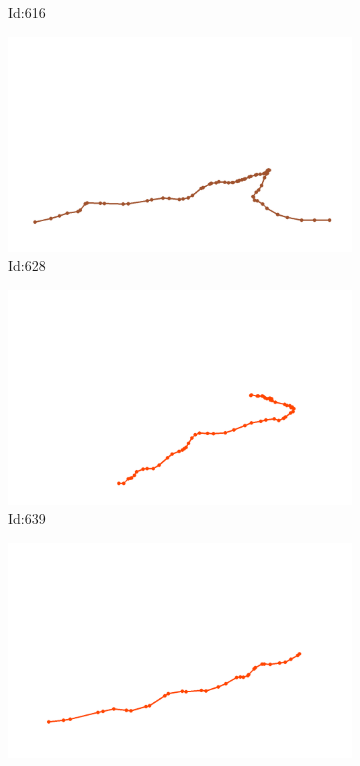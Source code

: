 \documentclass[12pt,twoside]{report}
\begin{document}
\begin{figure}
\begin{subfigure}[b]{0.20\textwidth}
\caption{Id:616}
\end{subfigure}
\begin{subfigure}[b]{0.20\textwidth}
\centering
\includegraphics[width=\textwidth]{../trajectories/628.png}
\caption{Id:628}
\end{subfigure}
\begin{subfigure}[b]{0.20\textwidth}
\centering
\includegraphics[width=\textwidth]{../trajectories/639.png}
\caption{Id:639}
\end{subfigure}
\begin{subfigure}[b]{0.20\textwidth}
\centering
\includegraphics[width=\textwidth]{../trajectories/737.png}

\end{subfigure}
\end{figure}
\end{document}
